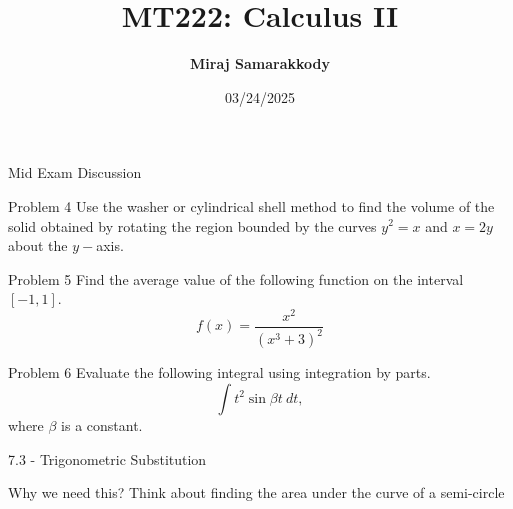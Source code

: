 \documentclass{beamer}
\title{MT222: Calculus II}
\author{\textbf{Miraj Samarakkody}}
\institute{Tougaloo College}
\date{03/24/2025}
\begin{document}
\begin{frame}
    \titlepage
\end{frame}


\begin{frame}{}
    \begin{center}
        \Huge{Mid Exam Discussion}
    \end{center}
    
\end{frame}





\begin{frame}{Problem 4}
    Use the washer or cylindrical shell method to find the volume of the solid obtained by rotating the region bounded by the curves $y^2=x$ and $x=2y$ about the $y-$axis.
\end{frame}

\begin{frame}{Problem 5}
    Find the average value of the following function on the interval \([-1,1]\). 
\[
f(x)=\dfrac{x^2}{(x^3+3)^2}
\] 
\end{frame}

\begin{frame}{Problem 6}
    Evaluate the following integral using integration by parts.
\[
\int t^2 \sin {\beta t}~dt,
\] where \(\beta \) is a constant. 
\end{frame}

\begin{frame}{}
    \begin{center}
        \Huge{7.3 - Trigonometric Substitution}
    \end{center}
    
\end{frame}

\begin{frame}{Why we need this?}
    Think about finding the area under the curve of a semi-circle
\end{frame}
\end{document}
